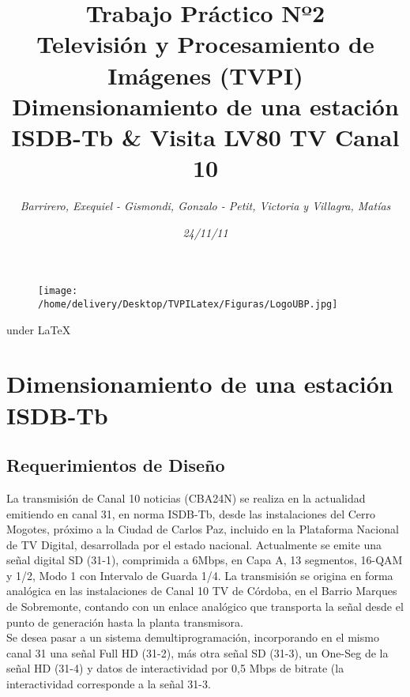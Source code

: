 \documentclass[a4paper,11pt]{article} %
\title{\Large Trabajo Práctico Nº2\\\Large
Televisi\'on y Procesamiento de Im\'agenes (TVPI) \\[2cm]\huge
Dimensionamiento de una estaci\'on ISDB-Tb \& Visita LV80 TV Canal
10 \\[2cm]}
\author{\emph{Barrirero, Exequiel - Gismondi, Gonzalo - Petit,
Victoria y Villagra, Mat\'ias}}
\date{\textit{24/11/11}}
\begin{document}
\maketitle
\thispagestyle{empty}

\begin{figure}[htb] %
\centering
\texttt{[image: /home/delivery/Desktop/TVPILatex/Figuras/LogoUBP.jpg]}

\end{figure}
\begin{center}
\small under \LaTeX
\end{center}

\newpage
\begin{center}
\tableofcontents
\listoffigures
\end{center}

\newpage
{}
\setcounter{page}{1}
\section{Dimensionamiento de una estaci\'on ISDB-Tb}

\subsection{Requerimientos de Dise\~no}
La transmisión de Canal 10 noticias (CBA24N) se realiza en la actualidad
emitiendo en canal 31, en norma ISDB-Tb, desde las instalaciones del
Cerro Mogotes, próximo a la Ciudad de Carlos Paz, incluido en la
Plataforma Nacional de TV Digital, desarrollada por el estado nacional.
Actualmente se emite una señal digital SD (31-1), comprimida a 6Mbps, en
Capa A, 13 segmentos, 16-QAM y 1/2, Modo 1 con Intervalo de Guarda 1/4.
La transmisión se origina en forma analógica en las instalaciones de
Canal 10 TV de Córdoba, en el Barrio Marques de Sobremonte, contando con
un enlace analógico que transporta la señal desde el punto de generación
hasta la planta transmisora. 
\\

Se desea pasar a un sistema
demultiprogramación, incorporando en el mismo canal 31 una señal Full HD
(31-2), más otra señal SD (31-3), un One-Seg de la señal HD (31-4) y
datos de interactividad por 0,5 Mbps de bitrate (la interactividad
corresponde a la señal 31-3.
\end{document}
